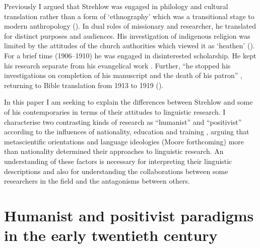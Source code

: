 \documentclass[output=paper]{langsci/langscibook}
\begin{document}
 Previously I argued that Strehlow was engaged in philology and cultural translation rather than a form of ‘ethnography’ which was a transitional stage to modern anthropology (\citealt[336]{harding_indigenous_2018}). In dual roles of missionary and researcher, he translated for distinct purposes and audiences. His investigation of indigenous religion was limited by the attitudes of the church authorities which viewed it as ‘heathen’ (\citealt[338]{harding_indigenous_2018}).  For a brief time (1906--1910) he was engaged in disinterested scholarship. He kept his research separate from his evangelical work \citep[232]{brock_evangelism_2017}. Further, “he stopped his investigations on completion of his manuscript and the death of his patron” \citep[236]{brock_evangelism_2017}, returning to Bible translation from 1913 to 1919 (\citealt[336]{harding_indigenous_2018}).
 
 In this paper I am seeking to explain the differences between Strehlow and some of his contemporaries in terms of their attitudes to linguistic research. I characterise two contrasting kinds of research as ``humanist'' and ``positivist'' according to the influences of nationality, education and training \citep[94]{errington_linguistics_2008}, arguing that metascientific orientations and language ideologies (Moore forthcoming) more than nationality determined their approaches to linguistic research. An understanding of these factors is necessary for interpreting their linguistic descriptions and also for understanding the collaborations between some researchers in the field and the antagonisms between others.  
 
\section{Humanist and positivist paradigms in the early twentieth century}
\end{document}
